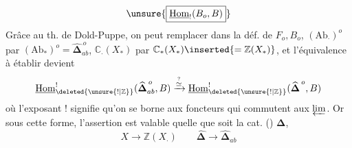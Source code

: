 \[
\unsure{\boxed{\underline{\operatorname{Hom}}_!(B_o,B)}}
\]
Grâce au th. de Dold-Puppe, on peut
remplacer dans la déf. de
$F_o,B_o$, $(\mathrm{Ab}_\cdot)^o$ par $(\mathrm{Ab}_*)^o=\widehat{\boldsymbol\Delta}_{ab}^{\,o}$,
$\mathbb C_\cdot(X_*)$ par $\mathbb C_*(X_*)\inserted{=\mathbb Z(X_*)}$, et l'équivalence à établir
devient
\[
\underline{\operatorname{Hom}}^{!}_{\deleted{\unsure{!|\mathbb Z}}}
(\widehat{\boldsymbol\Delta}_{ab}^{\,o},B)
\xrightarrow{\overset{?}{\simeq}}
\underline{\operatorname{Hom}}^{!}_{\deleted{\unsure{!|\mathbb Z}}}(\widehat{\boldsymbol\Delta}^{\,o},B)
\]
où l'exposant ! signifie qu'on se borne
aux foncteurs qui commutent aux $\varprojlim$.
Or sous cette forme, l'assertion est
valable quelle que soit la cat. ()
$\boldsymbol\Delta$, 
\[
X\longrightarrow\mathbb Z(X_\cdot)\qquad
\widehat{\boldsymbol\Delta}\longrightarrow\widehat{\boldsymbol\Delta}_{ab}
\]
